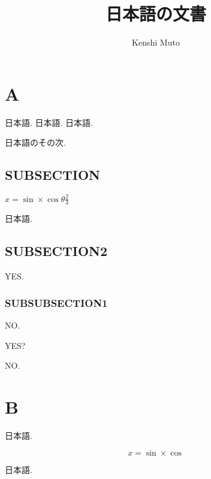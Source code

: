 \documentclass{jsarticle}
\title{日本語の文書}
\author{Kenshi Muto}
\begin{document}
\maketitle

\section{A}

日本語.
日本語.
日本語.

日本語のその次.

\subsection{SUBSECTION}

$x=\sin \times \cos \theta \frac{2}{3}$

日本語.

\subsection{SUBSECTION2}

YES.

\subsubsection{SUBSUBSECTION1}

NO.

YES?

\noindent
NO.

\section{B}

日本語.

\begin{equation*}
x=\sin \times \cos
\end{equation*}

日本語.
\end{document}
